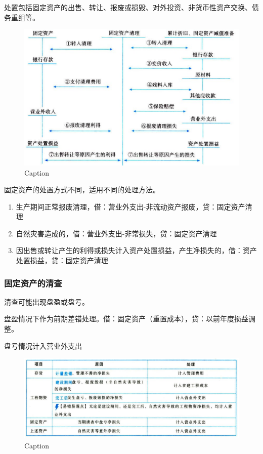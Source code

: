 \documentclass[UTF8,12pt]{ctexart}
\numberwithin{equation}{section} %
\numberwithin{figure}{section}
\numberwithin{table}{section}
\begin{document}
	处置包括固定资产的出售、转让、报废或损毁、对外投资、非货币性资产交换、债务重组等。
	\begin{figure}[htp]
		\centering
		\includegraphics[width=1\linewidth]{pic/3.3.png}
		\caption{Caption}
		\label{fig:enter-label}
	\end{figure}
	
	固定资产的处置方式不同，适用不同的处理方法。
	\begin{enumerate}
		\item 生产期间正常报废清理，借：营业外支出-非流动资产报废，贷：固定资产清理
		
		\item 自然灾害造成的，借：营业外支出-非常损失，贷：固定资产清理
		
		\item 因出售或转让产生的利得或损失计入资产处置损益，产生净损失的，借：资产处置损益，贷：固定资产清理
	\end{enumerate}
	
	\subsubsection{固定资产的清查}
	清查可能出现盘盈或盘亏。
	
	盘盈情况下作为前期差错处理。借：固定资产（重置成本），贷：以前年度损益调整。
	
	盘亏情况计入营业外支出
	\begin{figure}[htp]
		\centering
		\includegraphics[width=1\linewidth]{pic/3.4.png}
		\caption{Caption}
		\label{fig:enter-label}
	\end{figure}
	
\end{document}
